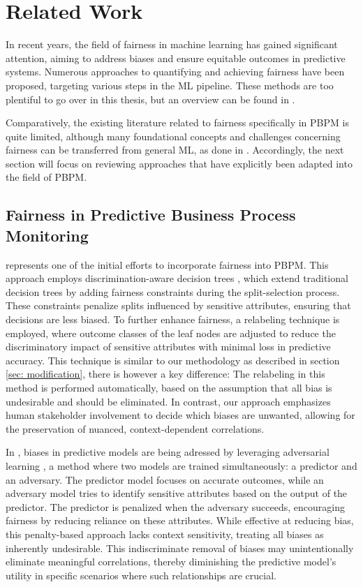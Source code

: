 \chapter{Related Work}
In recent years, the field of fairness in machine learning has gained significant attention,
aiming to address biases and ensure equitable outcomes in predictive systems.
Numerous approaches to quantifying and achieving fairness have been proposed,
targeting various steps in the ML pipeline.
These methods are too plentiful to go over in this thesis,
but an overview can be found in \cite{fairness_ml}.

Comparatively, the existing literature related to fairness specifically in PBPM is quite limited,
although many foundational concepts and challenges concerning fairness can be transferred
from general ML, as done in \cite{fairness_overview}.
Accordingly, the next section will focus on reviewing approaches
that have explicitly been adapted into the field of PBPM.

\section{Fairness in Predictive Business Process Monitoring}
\cite{fairness_foundation} represents one of the initial efforts to incorporate fairness into PBPM.
This approach employs discrimination-aware decision trees \cite{fairness_decision_tree},
which extend traditional decision trees by adding fairness constraints during the split-selection process.
These constraints penalize splits influenced by sensitive attributes,
ensuring that decisions are less biased. 
To further enhance fairness,
a relabeling technique is employed, where outcome classes of the leaf nodes are adjusted
to reduce the discriminatory impact of sensitive attributes with minimal loss in predictive accuracy.
This technique is similar to our methodology as described in section \ref{sec: modification},
there is however a key difference:
The relabeling in this method is performed automatically,
based on the assumption that all bias is undesirable and should be eliminated.
In contrast, our approach emphasizes human stakeholder involvement to decide which biases are unwanted,
allowing for the preservation of nuanced, context-dependent correlations.

In \cite{fairness_adversarial},
biases in predictive models are being adressed by leveraging adversarial learning \cite{gan},
a method where two models are trained simultaneously: a predictor and an adversary.
The predictor model focuses on accurate outcomes,
while an adversary model tries to identify sensitive attributes based on the output of the predictor.
The predictor is penalized when the adversary succeeds,
encouraging fairness by reducing reliance on these attributes.
While effective at reducing bias,
this penalty-based approach lacks context sensitivity,
treating all biases as inherently undesirable.
This indiscriminate removal of biases may unintentionally eliminate meaningful correlations,
thereby diminishing the predictive model's utility in specific scenarios
where such relationships are crucial.

